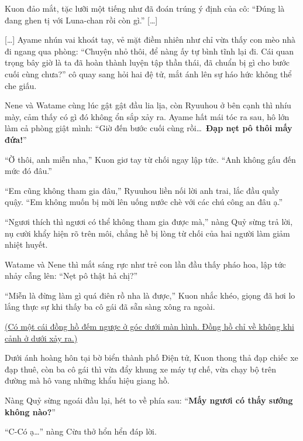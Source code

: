 \documentclass[../main.tex]{subfiles}
\begin{document}
Kuon đảo mắt, tặc lưỡi một tiếng như đã đoán trúng ý định của cô: ``Đúng là đang ghen tị với Luna-chan rồi còn gì.'' [\dots]

{\color{silver}}   %

[\dots] Ayame nhún vai khoát tay, vẻ mặt điềm nhiên như chỉ vừa thấy con mèo nhà đi ngang qua phòng: ``Chuyện nhỏ thôi, để nàng ấy tự bình tĩnh lại đi. Cái quan trọng bây giờ là ta đã hoàn thành luyện tập thần thái, đã chuẩn bị gì cho bước cuối cùng chưa?'' cô quay sang hỏi hai đệ tử, mắt ánh lên sự háo hức không thể che giấu.

Nene và Watame cùng lúc gật gật đầu lia lịa, còn Ryuuhou ở bên cạnh thì nhíu mày, cảm thấy có gì đó không ổn sắp xảy ra. Ayame hất mái tóc ra sau, hô lớn làm cả phòng giật mình: ``Giờ đến bước cuối cùng rồi\dots\ \textbf{Đạp nẹt pô thôi mấy đứa!}''

``Ờ thôi, anh miễn nha,'' Kuon giơ tay từ chối ngay lập tức. ``Anh không gấu đến mức đó đâu.''

``Em cũng không tham gia đâu,'' Ryuuhou liền nối lời anh trai, lắc đầu quầy quậy. ``Em không muốn bị mời lên uống nước chè với các chú công an đâu ạ.''

``Ngươi thích thì ngươi có thể không tham gia được mà,'' nàng Quỷ sừng trả lời, nụ cười khẩy hiện rõ trên môi, chẳng hề bị lòng từ chối của hai người làm giảm nhiệt huyết.

Watame và Nene thì mắt sáng rực như trẻ con lần đầu thấy pháo hoa, lập tức nhảy cẫng lên: ``Nẹt pô thật hả chị?''

``Miễn là đừng làm gì quá điên rồ nha là được,'' Kuon nhắc khéo, giọng đã hơi lo lắng thực sự khi thấy ba cô gái đã sẵn sàng xông ra ngoài.

\begin{center}
  \uline{(Có một cái đồng hồ đếm ngược ở góc dưới màn hình. Đồng hồ chỉ về không khi cảnh ở dưới xảy ra.)}
\end{center}

\ct

Dưới ánh hoàng hôn tại bờ biển thành phố Điện tử, Kuon thong thả đạp chiếc xe đạp thuê, còn ba cô gái thì vừa đẩy khung xe máy tự chế, vừa chạy bộ trên đường mà hô vang những khẩu hiệu giang hồ.


Nàng Quỷ sừng ngoái đầu lại, hét to về phía sau: ``\textbf{Mấy ngươi có thấy sướng không nào?}''

``C-Có ạ\dots'' nàng Cừu thở hổn hển đáp lời.
\end{document}
